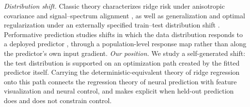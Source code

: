 {\color{red}\textit{Distribution shift.}}
Classic theory characterizes ridge risk under anisotropic covariance and signal--spectrum alignment \citep{dobriban2018high,hastie2022surprises,mei2022generalization,mel2021highDimensionalRegression}, as well as generalization and optimal regularization under an externally specified train--test distribution shift \citep{canatar2021outOfDistribution,tripuraneni2021covariateShift,patil2024optimalOODRidge}. {\color{red}Performative prediction studies shifts in which the data distribution responds to a deployed predictor \citep{perdomo2020performative}, through a population-level response map rather than along the predictor's own input gradient.
\textit{Our position.} We study a self-generated shift: the test distribution is supported on an optimization path created by the fitted predictor itself. Carrying the deterministic-equivalent theory of ridge regression onto this path connects the regression theory of neural prediction with feature visualization and neural control, and makes explicit when held-out prediction does and does not constrain control.}
